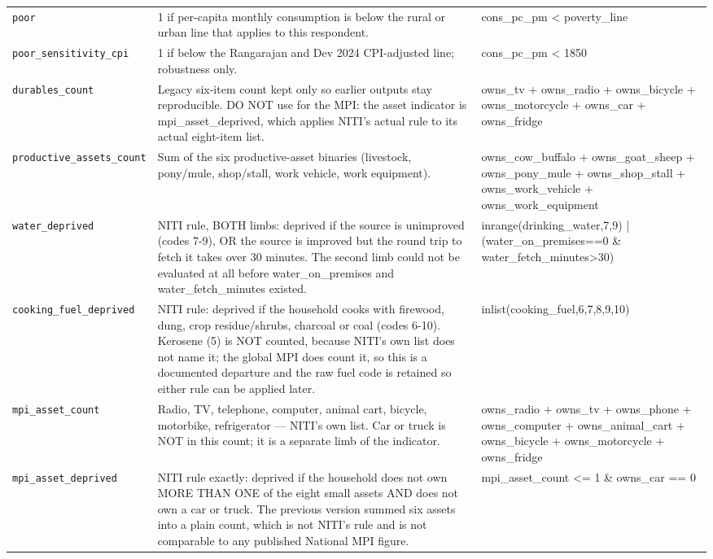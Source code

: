\documentclass[10pt]{article}
\begin{document}
{\begin{longtable}{p{3.3cm}p{7.6cm}p{5.7cm}}
\texttt{poor} & 1 if per-capita monthly consumption is below the rural or urban line that applies to this respondent. & cons\_pc\_pm < poverty\_line \\
\texttt{poor\_sensitivity\_cpi} & 1 if below the Rangarajan and Dev 2024 CPI-adjusted line; robustness only. & cons\_pc\_pm < 1850 \\
\texttt{durables\_count} & Legacy six-item count kept only so earlier outputs stay reproducible. DO NOT use for the MPI: the asset indicator is mpi\_asset\_deprived, which applies NITI's actual rule to its actual eight-item list. & owns\_tv + owns\_radio + owns\_bicycle + owns\_motorcycle + owns\_car + owns\_fridge \\
\texttt{productive\_assets\_count} & Sum of the six productive-asset binaries (livestock, pony/mule, shop/stall, work vehicle, work equipment). & owns\_cow\_buffalo + owns\_goat\_sheep + owns\_pony\_mule + owns\_shop\_stall + owns\_work\_vehicle + owns\_work\_equipment \\
\texttt{water\_deprived} & NITI rule, BOTH limbs: deprived if the source is unimproved (codes 7-9), OR the source is improved but the round trip to fetch it takes over 30 minutes. The second limb could not be evaluated at all before water\_on\_premises and water\_fetch\_minutes existed. & inrange(drinking\_water,7,9) | (water\_on\_premises==0 \& water\_fetch\_minutes>30) \\
\texttt{cooking\_fuel\_deprived} & NITI rule: deprived if the household cooks with firewood, dung, crop residue/shrubs, charcoal or coal (codes 6-10). Kerosene (5) is NOT counted, because NITI's own list does not name it; the global MPI does count it, so this is a documented departure and the raw fuel code is retained so either rule can be applied later. & inlist(cooking\_fuel,6,7,8,9,10) \\
\texttt{mpi\_asset\_count} & Radio, TV, telephone, computer, animal cart, bicycle, motorbike, refrigerator — NITI's own list. Car or truck is NOT in this count; it is a separate limb of the indicator. & owns\_radio + owns\_tv + owns\_phone + owns\_computer + owns\_animal\_cart + owns\_bicycle + owns\_motorcycle + owns\_fridge \\
\texttt{mpi\_asset\_deprived} & NITI rule exactly: deprived if the household does not own MORE THAN ONE of the eight small assets AND does not own a car or truck. The previous version summed six assets into a plain count, which is not NITI's rule and is not comparable to any published National MPI figure. & mpi\_asset\_count <= 1 \& owns\_car == 0 \\

\end{longtable}}
\end{document}
